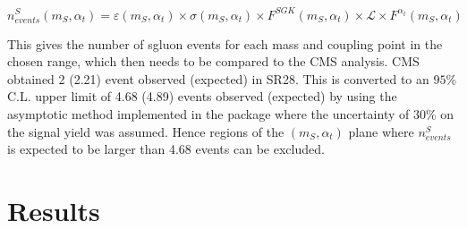 \begin{equation}
n^{S}_{events}\left(m_{S},\alpha_{t}\right) = \varepsilon\left(m_{S},\alpha_{t}\right)\times \sigma\left(m_{S},\alpha_{t}\right) \times F^{SGK}\left(m_{S},\alpha_{t}\right) \times \mathcal{L}\times F^{\alpha_{t}}\left(m_{S},\alpha_{t}\right)
\label{eqn:equivEvents}
\end{equation}

This gives the number of sgluon events for each mass and coupling point in the chosen range, which then needs to be compared to the CMS analysis. CMS obtained 2 (2.21) event observed (expected) in SR28. This is converted to an $95\%$ C.L. upper limit of 4.68 (4.89) events observed (expected) by using the asymptotic \CLS method implemented in the \ROOSTAT package where the uncertainty of $30\%$ on the signal yield was assumed. Hence regions of the $\left(m_{S},\alpha_{t}\right)$ plane where $n^{S}_{events}$ is expected to be larger than 4.68 events can be excluded.


\section{Results}






